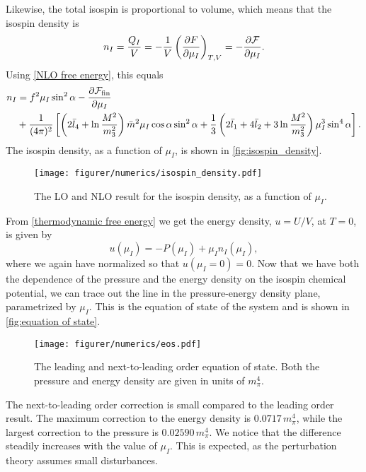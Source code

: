 Likewise, the total isospin is proportional to volume, which means that the isospin density is
\begin{equation}
    n_I = \frac{Q_I}{V} = - \frac{1}{V} \left(\diffp{F}{\mu_I}\right)_{T, V}
    = - \diffp{\Ef}{\mu_I}.
\end{equation}
%
Using \cref{NLO free energy}, this equals
\begin{align}
    \nonumber
    n_I & = 
    f^2 \mu_I \sin^2 \alpha
    - \diffp{\Ef_\mathrm{fin}}{\mu_I} \\
    & + \frac{1}{(4 \pi)^2}
    \left[
            \left(2\bar l_4+\ln\frac{M^2}{m_3^2}\right)\bar m^2 \mu_I \cos\alpha \sin^2 \alpha
            +\frac{1}{3}\left(2\bar l_1 + 4 \bar l_2 + 3\ln\frac{M^2}{m_3^2}\right)\mu_I^3 \sin^4 \alpha
    \right].
\end{align}
%
The isospin density, as a function of $\mu_I$, is shown in \autoref{fig:isospin_density}.
\begin{figure}[h]
    \centering
    \vspace{-0.2cm}
    \texttt{[image: figurer/numerics/isospin\_density.pdf]}
    \caption{The LO and NLO result for the isospin density, as a function of $\mu_I$.}
    \label{fig:isospin_density}
\end{figure}

From \cref{thermodynamic free energy} we get the energy density, $u = U/V$, at $T = 0$, is given by
\begin{equation}
    u(\mu_I) = -P(\mu_I) + \mu_I n_I(\mu_I),
\end{equation}
%
where we again have normalized so that $u(\mu_I = 0) = 0$.
Now that we have both the dependence of the pressure and the energy density on the isospin chemical potential, we can trace out the line in the pressure-energy density plane, parametrized by $\mu_I$.
This is the equation of state of the system and is shown in \autoref{fig:equation of state}.

\begin{figure}[h]
    \centering
    \vspace{-0.2cm}
    \texttt{[image: figurer/numerics/eos.pdf]}
    \caption{The leading and next-to-leading order equation of state. Both the pressure and energy density are given in units of $m_\pi^4$.}
    \label{fig:equation of state}
\end{figure}


The next-to-leading order correction is small compared to the leading order result.
The maximum correction to the energy density is $0.0717 \, m_\pi^4$, while the largest correction to the pressure is $0.02590\, m_\pi^4$.
We notice that the difference steadily increases with the value of $\mu_I$.
This is expected, as the perturbation theory assumes small disturbances.

